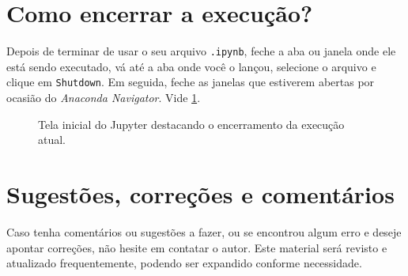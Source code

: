 \documentclass[a4paper,12pt]{article}
\begin{document}
\section*{Como encerrar a execução?}

Depois de terminar de usar o seu arquivo \texttt{.ipynb}, feche a aba ou janela onde ele está sendo executado, vá até a aba onde você o lançou, selecione o arquivo e clique em \texttt{Shutdown}. Em seguida, feche as janelas que estiverem abertas por ocasião do \emph{Anaconda Navigator}. Vide \ref{fig:shutdown}.
 \begin{figure}[h!]
\centering
\caption{\label{fig:shutdown}Tela inicial do Jupyter destacando o encerramento da execução atual.}
\end{figure}  

\section*{Sugestões, correções e comentários}

Caso tenha comentários ou sugestões a fazer, ou se encontrou algum erro e deseje apontar correções, não hesite em contatar o autor. Este material será revisto e atualizado frequentemente, podendo ser expandido conforme necessidade. 
\end{document}
